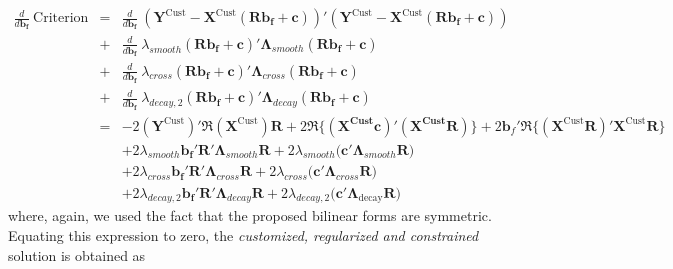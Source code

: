 \documentclass[a4paper]{book}
\begin{document}
\begin{eqnarray*}
\frac{d}{d\mathbf{b_f}}~\textrm{Criterion}&=&\frac{d}{d\mathbf{b_f}}~(\mathbf{Y}^{\textrm{Cust}}-\mathbf{X}^{\textrm{Cust}}\left(\mathbf{R b_{f}+c}\right))'(\mathbf{Y}^{\textrm{Cust}}-\mathbf{X}^{\textrm{Cust}}\left(\mathbf{R b_{f}+c}\right))\nonumber\\
&+&\frac{d}{d\mathbf{b_f}}~\lambda_{{smooth}}\left(\mathbf{R b_{f}+c}\right)'\boldsymbol{\Lambda}_{smooth}\left(\mathbf{R b_{f}+c}\right)\\
&+&\frac{d}{d\mathbf{b_f}}~\lambda_{{cross}}\left(\mathbf{R b_{f}+c}\right)'\boldsymbol{\Lambda}_{cross}\left(\mathbf{R b_{f}+c}\right)\\
&+&\frac{d}{d\mathbf{b_f}}~\lambda_{{decay},2}\left(\mathbf{R b_{f}+c}\right)'\boldsymbol{\Lambda}_{decay}\left(\mathbf{R b_{f}+c}\right)\\
&=&-2(\mathbf{Y}^{\textrm{Cust}})'\Re\left(\mathbf{X}^{\textrm{Cust}}\right)\mathbf{R}+
2\Re\bigg\{\mathbf{(X^{\textrm{Cust}}c)'(X^{\textrm{Cust}}R)}\bigg\}
+2\mathbf{b}_f'\Re\bigg\{(\mathbf{X}^{\textrm{Cust}}\mathbf{R})'\mathbf{X}^{\textrm{Cust}}\mathbf{R}\bigg\}\\
&&+2\lambda_{{smooth}}\mathbf{b_f'R'}\boldsymbol{\Lambda}_{smooth}\mathbf{R}+2\lambda_{{smooth}}\mathbf{(c'}\boldsymbol{\Lambda}_{{smooth}}\mathbf{R)}\\
&&+2\lambda_{{cross}}\mathbf{b_f'R'}\boldsymbol{\Lambda}_{cross}\mathbf{R}+2\lambda_{{cross}}\mathbf{(c'}\boldsymbol{\Lambda}_{{cross}}\mathbf{R)}\\
&&+2\lambda_{{decay},2}\mathbf{b_f'R'}\boldsymbol{\Lambda}_{decay}\mathbf{R}+2\lambda_{{decay},2}\mathbf{(c'}\boldsymbol{\Lambda}_{\textrm{decay}}\mathbf{R)}
\end{eqnarray*}
where, again, we used the fact that the proposed bilinear forms are symmetric. Equating this expression to zero, the \emph{customized, regularized and constrained }solution is obtained as
\end{document}

